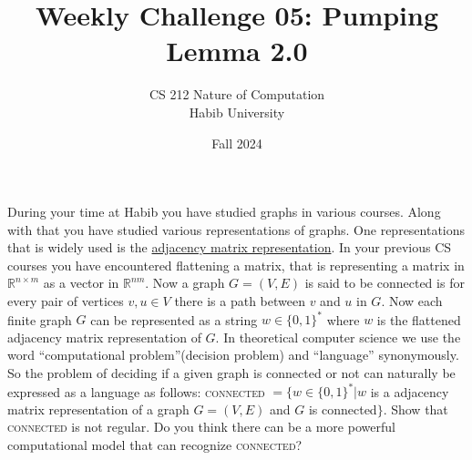 \documentclass[a4paper]{exam}
\title{Weekly Challenge 05: Pumping Lemma 2.0}
\author{CS 212 Nature of Computation\\Habib University}
\date{Fall 2024}
\theoremstyle{definition}
\theoremstyle{claim}
\begin{document}
\maketitle

\begin{questions}
    During your time at Habib you have studied graphs in various courses. Along with that you have studied various representations of graphs. One representations that is widely used is the \href{https://en.wikipedia.org/wiki/Adjacency_matrix}{adjacency matrix representation}.
    In your previous CS courses you have encountered flattening a matrix, that is representing a matrix in $\mathbb{R}^{n\times m}$ as a vector in $\mathbb{R}^{n m}$. Now a graph $G = (V, E)$ is said to be connected is for every pair of vertices $v,u \in V$ there is a path between $v$ and $u$ in $G$. Now each finite graph $G$ can be represented as a string $w \in \{0,1\}^*$ where $w$ is the flattened adjacency matrix representation of $G$. In theoretical computer science we use the word ``computational problem''(decision problem) and ``language'' synonymously. So the problem of deciding if a given graph is connected or not can naturally be expressed as a language as follows:
    \textsc{connected} $ = \{w \in \{0,1\}^*| w$ is a adjacency matrix representation of a graph $G = (V,E)$ and $G$ is connected$\}$. Show that \textsc{connected} is not regular. Do you think there can be a more powerful computational model that can recognize \textsc{connected}? 
    \begin{solution}

    \end{solution}
  
\end{questions}
\end{document}
